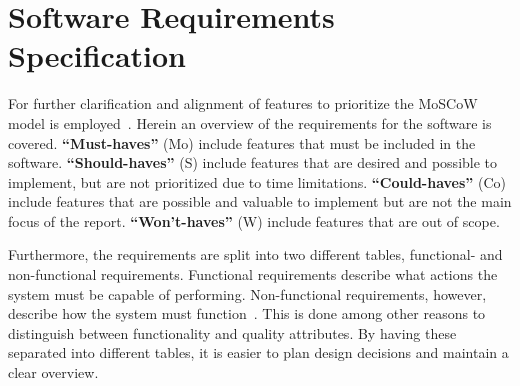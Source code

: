 \section{Software Requirements Specification}\label{sec:software-requirements-specification}

For further clarification and alignment of features to prioritize the MoSCoW model is employed~\cite{hudaib2018}.
Herein an overview of the requirements for the software is covered.
\textbf{``Must-haves''} (Mo) include features that must be included in the software.
\textbf{``Should-haves''} (S) include features that are desired and possible to implement, but are not prioritized
due to time limitations.
\textbf{``Could-haves''} (Co) include features that are possible and valuable to implement but are not the main
focus of the report.
\textbf{``Won't-haves''} (W) include features that are out of scope.

Furthermore, the requirements are split into two different tables, functional- and non-functional requirements.
Functional requirements describe what actions the system must be capable of performing.
Non-functional requirements, however, describe how the system must function~\cite{benyon2019}.
This is done among other reasons to distinguish between functionality and quality attributes.
By having these separated into different tables, it is easier to plan design decisions and maintain a clear overview.

\begin{table}[H]
    \centering
    \caption{MoSCoW model of the functional requirements specification.
    The \textit{Functional requirement} column describes the listed requirements for the software.
    The \textit{MoSCoW annotation} column covers the category to which the requirements belong.
    The \textit{Motivation} column encompasses where in the report the motivation for the requirements is located.
    }\label{tab:functional-requirements-specification}
\end{table}


